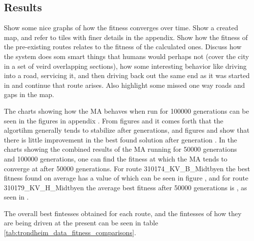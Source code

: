 \subsection{Results}
Show some nice graphs of how the fitness converges over time.
Show a created map, and refer to tiles with finer details in the appendix.
Show how the fitness of the pre-existing routes relates to the fitness of the calculated ones.
Discuss how the system does som smart things that humans would perhaps not (cover the city in a set of veird overlapping sections), how some interesting behavior like driving into a road, servicing it, and then driving back out the same end as it was started in and continue that route arises. Also highlight some missed one way roads and gaps in the map.



The charts showing how the MA behaves when run for 100000 generations can be seen in the figures in appendix . From figures  and  it comes forth that the algortihm generally tends to stabilize after  generations, and figures  and  show that there is little improvement in the best found solution after generation . In the charts showing the combined results of the MA running for 50000 generations and 100000 generations, one can find the fitness at which the MA tends to converge at after 50000 generations. For route 310174\_KV\_B\_Midtbyen the best fitness found on average has a value of  which can be seen in figure , and for route 310179\_KV\_H\_Midtbyen the average best fitness after 50000 generations is , as seen in .

The overall best fintesses obtained for each route, and the fintesses of how they are being driven at the present can be seen in table \ref{tab:trondheim_data_fitness_comparisons}.


{
\begin{table}[tbph]
\centering
{} %
\caption{The best result obtained from the MA and the known optimal solution for the BHW1 benchmark.}
\label{tab:trondheim_data_fitness_comparisons}
\end{table}
}





\cleardoublepage